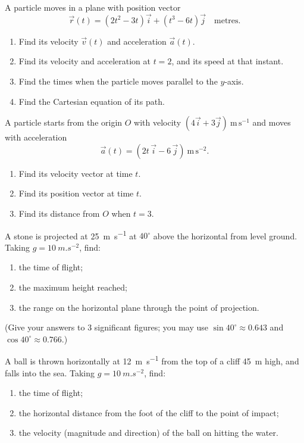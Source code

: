 \documentclass[11pt]{article}
\newcounter{popsec}
\newcounter{popsub}
\newcommand{\courssub}[1]{%
  \stepcounter{popsub}%
  \par\vspace{9pt}\noindent{\popxbold\fontsize{11.5}{13}\selectfont\color{popink}{\color{poporange}\thepopsec.\thepopsub}\hspace{6pt}#1}\par\nopagebreak\vspace{4pt}
}
\begin{document}
\courssub{I practise}

\begin{exercice}
A particle moves in a plane with position vector
\[ \vec{r}(t) = (2t^2 - 3t)\vec{i} + (t^3 - 6t)\vec{j} \quad \text{metres}. \]
\begin{enumerate}
\item Find its velocity $\vec{v}(t)$ and acceleration $\vec{a}(t)$.
\item Find its velocity and acceleration at $t = 2$, and its speed at that instant.
\item Find the times when the particle moves parallel to the $y$-axis.
\item Find the Cartesian equation of its path.
\end{enumerate}
\end{exercice}

\begin{exercice}
A particle starts from the origin $O$ with velocity $(4\vec{i} + 3\vec{j})\ \mathrm{m\,s^{-1}}$ and moves with acceleration
\[ \vec{a}(t) = (2t\,\vec{i} - 6\,\vec{j})\ \mathrm{m\,s^{-2}}. \]
\begin{enumerate}
\item Find its velocity vector at time $t$.
\item Find its position vector at time $t$.
\item Find its distance from $O$ when $t = 3$.
\end{enumerate}
\end{exercice}

\begin{exercice}
A stone is projected at \SI{25}{m.s^{-1}} at $40^\circ$ above the horizontal from level ground. Taking $g = \SI{10}{m.s^{-2}}$, find:
\begin{enumerate}
\item the time of flight;
\item the maximum height reached;
\item the range on the horizontal plane through the point of projection.
\end{enumerate}
(Give your answers to 3 significant figures; you may use $\sin 40^\circ \approx 0.643$ and $\cos 40^\circ \approx 0.766$.)
\end{exercice}

\begin{exercice}
A ball is thrown horizontally at \SI{12}{m.s^{-1}} from the top of a cliff \SI{45}{m} high, and falls into the sea. Taking $g = \SI{10}{m.s^{-2}}$, find:
\begin{enumerate}
\item the time of flight;
\item the horizontal distance from the foot of the cliff to the point of impact;
\item the velocity (magnitude and direction) of the ball on hitting the water.
\end{enumerate}
\end{exercice}
\end{document}

